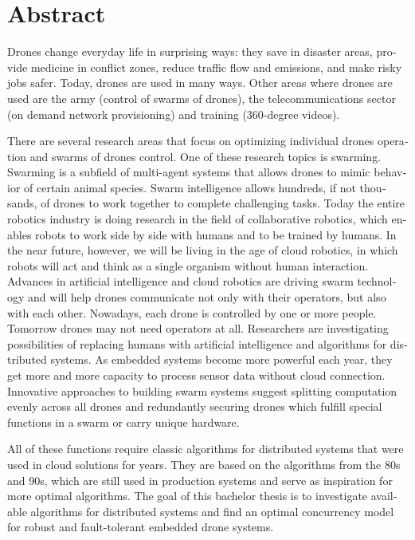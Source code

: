\chapter{Abstract}


\begin{english} %

Drones change everyday life in surprising ways: they save in disaster areas, provide medicine in conflict zones, reduce traffic flow and emissions, and make risky jobs safer. Today, drones are used in many ways. Other areas where drones are used are the army (control of swarms of drones), the telecommunications sector (on demand network provisioning) and training (360-degree videos).

There are several research areas that focus on optimizing individual drones operation and swarms of drones control. One of these research topics is swarming. Swarming is a subfield of multi-agent systems that allows drones to mimic behavior of certain animal species. Swarm intelligence allows hundreds, if not thousands, of drones to work together to complete challenging tasks. Today the entire robotics industry is doing research in the field of collaborative robotics, which enables robots to work side by side with humans and to be trained by humans. In the near future, however, we will be living in the age of cloud robotics, in which robots will act and think as a single organism without human interaction. Advances in artificial intelligence and cloud robotics are driving swarm technology and will help drones communicate not only with their operators, but also with each other. Nowadays, each drone is controlled by one or more people. Tomorrow drones may not need operators at all. Researchers are investigating possibilities of replacing humans with artificial intelligence and algorithms for distributed systems. As embedded systems become more powerful each year, they get more and more capacity to process sensor data without cloud connection. Innovative approaches to building swarm systems suggest splitting computation evenly across all drones and redundantly securing drones which fulfill special functions in a swarm or carry unique hardware.

All of these functions require classic algorithms for distributed systems that were used in cloud solutions for years. They are based on the algorithms from the 80s and 90s, which are still used in production systems and serve as inspiration for more optimal algorithms. The goal of this bachelor thesis is to investigate available algorithms for distributed systems and find an optimal concurrency model for robust and fault-tolerant embedded drone systems.


\end{english}

